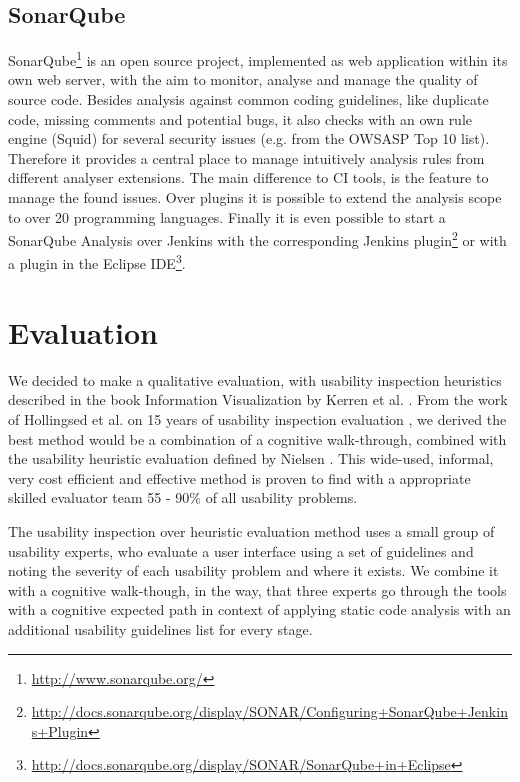 \documentclass[conference]{IEEEtran}
\begin{document}
\subsection{SonarQube}
\label{subsec:sonarqube}
SonarQube\footnote{\href{http://www.sonarqube.org/}{http://www.sonarqube.org/}} is an open source project, implemented as web application within its own web server, with the aim to monitor, analyse and manage the quality of source code. 
Besides analysis against common coding guidelines, like duplicate code, missing comments and potential bugs, it also checks with an own rule engine (Squid) for several security issues (e.g. from the OWSASP Top 10 list).
Therefore it provides a central place to manage intuitively analysis rules from different analyser extensions.
The main difference to CI tools, is the feature to manage the found issues.
Over plugins it is possible to extend the analysis scope to over 20 programming languages.
Finally it is even possible to start a SonarQube Analysis over Jenkins with the corresponding Jenkins plugin\footnote{\href{http://docs.sonarqube.org/display/SONAR/Configuring+SonarQube+Jenkins+Plugin}{http://docs.sonarqube.org/display/SONAR/Configuring+SonarQube+Jenkins+Plugin}}  or with a plugin in the Eclipse IDE\footnote{\href{http://docs.sonarqube.org/display/SONAR/SonarQube+in+Eclipse}{http://docs.sonarqube.org/display/SONAR/SonarQube+in+Eclipse}}.



\section{Evaluation}
\label{sec:evaluation}
We decided to make a qualitative evaluation, with usability inspection heuristics described in the book Information Visualization by Kerren et al. \cite{InformationVisualizationBook}.
From the work of Hollingsed et al. on 15 years of usability inspection evaluation \cite{15yearsUsabilityEvaluation}, we derived the best method would be a combination of a cognitive walk-through, combined with the usability heuristic evaluation defined by Nielsen \cite{Nielsen:UsabilityInspectionMethods}.
This wide-used, informal, very cost efficient and effective method is proven to find with a appropriate skilled evaluator team 55 - 90\% of all usability problems.


The usability inspection over heuristic evaluation method uses a small group of usability experts, who evaluate a
user interface using a set of guidelines and noting the severity of
each usability problem and where it exists. 
We combine it with a cognitive walk-though, in the way, that three experts go through the tools with a cognitive expected path in context of applying static code analysis with an additional usability guidelines list for every stage.
\end{document}
